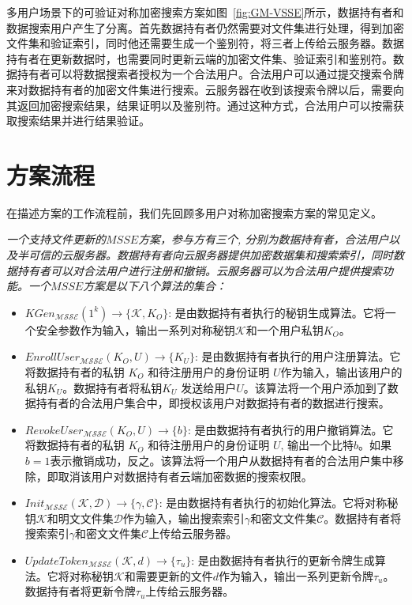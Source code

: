 多用户场景下的可验证对称加密搜索方案\multi 如图~\ref{fig:GM-VSSE}所示，数据持有者和数据搜索用户产生了分离。首先数据持有者仍然需要对文件集进行处理，得到加密文件集和验证索引，同时他还需要生成一个鉴别符，将三者上传给云服务器。数据持有者在更新数据时，也需要同时更新云端的加密文件集、验证索引和鉴别符。数据持有者可以将数据搜索者授权为一个合法用户。合法用户可以通过提交搜索令牌来对数据持有者的加密文件集进行搜索。云服务器在收到该搜索令牌以后，需要向其返回加密搜索结果，结果证明以及鉴别符。通过这种方式，合法用户可以按需获取搜索结果并进行结果验证。


\section{方案流程}
在描述\multi 方案的工作流程前，我们先回顾多用户对称加密搜索方案的常见定义。
\begin{definition}\label{def:MSSE}
  {\itshape
      一个支持文件更新的$MSSE$方案，参与方有三个, 分别为数据持有者，合法用户以及半可信的云服务器。数据持有者向云服务器提供加密数据集和搜索索引，同时数据持有者可以对合法用户进行注册和撤销。云服务器可以为合法用户提供搜索功能。一个$MSSE$方案是以下八个算法的集合：
      \begin{itemize}
        \item $KGen_{\mathcal{MSSE}}(1^k) \rightarrow \{\mathcal{K},K_O\}$: 是由数据持有者执行的秘钥生成算法。它将一个安全参数作为输入，输出一系列对称秘钥$\mathcal{K}$和一个用户私钥$K_O$。
        \item $EnrollUser_{\mathcal{MSSE}}(K_O,U) \rightarrow \{K_U\}$: 是由数据持有者执行的用户注册算法。它将数据持有者的私钥 $K_O$ 和待注册用户的身份证明 $U$作为输入，输出该用户的私钥$K_U$。数据持有者将私钥$K_U$ 发送给用户$U$。该算法将一个用户添加到了数据持有者的合法用户集合中，即授权该用户对数据持有者的数据进行搜索。
        \item $RevokeUser_{\mathcal{MSSE}}(K_O,U) \rightarrow \{b\}$: 是由数据持有者执行的用户撤销算法。它将数据持有者的私钥 $K_O$ 和待注册用户的身份证明 $U$, 输出一个比特$b$。如果$b=1$表示撤销成功，反之。该算法将一个用户从数据持有者的合法用户集中移除，即取消该用户对数据持有者云端加密数据的搜索权限。
        \item $Init_{\mathcal{MSSE}}(\mathcal{K}, \mathcal{D}) \rightarrow \{\gamma, \mathcal{C}\}$: 是由数据持有者执行的初始化算法。它将对称秘钥$\mathcal{K}$和明文文件集$\mathcal{D}$作为输入，输出搜索索引$\gamma$和密文文件集$\mathcal{C}$。数据持有者将搜索索引$\gamma$和密文文件集$\mathcal{C}$上传给云服务器。
        \item $UpdateToken_{\mathcal{MSSE}}(\mathcal{K}, d) \rightarrow \{\tau_u\}$: 是由数据持有者执行的更新令牌生成算法。它将对称秘钥$\mathcal{K}$和需要更新的文件$d$作为输入，输出一系列更新令牌$\tau_u$。数据持有者将更新令牌$\tau_u$上传给云服务器。

\end{itemize}}
\end{definition}
